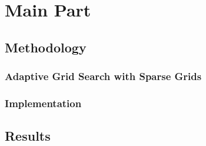 
\chapter{Main Part}\label{chapter:main_part}

\section{Methodology}

\subsection{Adaptive Grid Search with Sparse Grids}

\subsection{Implementation}

\section{Results}